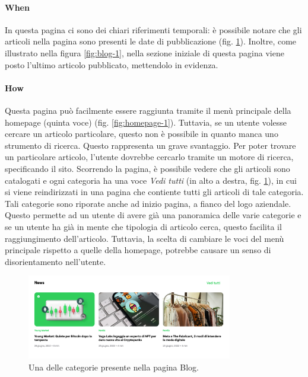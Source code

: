 \paragraph{When}

In questa pagina ci sono dei chiari riferimenti temporali: è possibile 
notare che gli articoli nella pagina sono presenti le date di pubblicazione 
(fig. \ref{fig:blog-2}). Inoltre, come illustrato nella figura 
\ref{fig:blog-1}, nella sezione iniziale di questa pagina viene posto 
l'ultimo articolo pubblicato, mettendolo in evidenza. 

\paragraph{How}

Questa pagina può facilmente essere raggiunta tramite il menù principale 
della homepage (quinta voce) (fig. \ref{fig:homepage-1}). Tuttavia, se un 
utente volesse cercare un articolo particolare, questo non è possibile 
in quanto manca uno strumento di ricerca. Questo rappresenta un grave 
svantaggio. Per poter trovare un particolare articolo, l'utente dovrebbe 
cercarlo tramite un motore di ricerca, specificando il sito. Scorrendo la 
pagina, è possibile vedere che gli articoli sono catalogati e ogni categoria 
ha una voce \textit{Vedi tutti} (in alto a destra, fig. \ref{fig:blog-2}), 
in cui si viene reindirizzati in una pagina che contiente tutti gli articoli 
di tale categoria. Tali categorie sono riporate anche ad inizio pagina, 
a fianco del logo aziendale. Questo permette ad un utente di avere già 
una panoramica delle varie categorie e se un utente ha già in mente che 
tipologia di articolo cerca, questo facilita il raggiungimento 
dell'articolo. Tuttavia, la scelta di cambiare le voci del menù principale 
rispetto a quelle della homepage, potrebbe causare un senso di 
disorientamento nell'utente.

\begin{figure}[H]
  \centering
  \includegraphics[width=0.80\textwidth]{res/images/internal-pages/blog/blog-2.png}
  \caption{Una delle categorie presente nella pagina Blog.}
  \label{fig:blog-2}
\end{figure}

